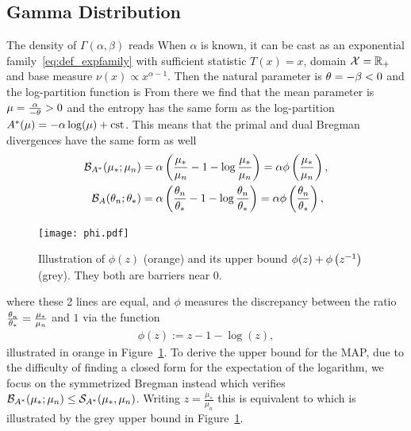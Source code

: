 \subsection{Gamma Distribution}
\label{app:gamma}
The density of $\Gamma(\alpha,\beta)$ reads
When $\alpha$ is known, it can be cast as an exponential family~\eqref{eq:def_expfamily} with sufficient statistic $T(x)=x$, domain ${\mathcal X} = \mathbb{R}_+$ and base measure $\nu(x)\propto x^{\alpha-1}$. Then the natural parameter is $\theta = -\beta < 0$ and the log-partition function is
From there we find that the mean parameter is $\mu = \frac{\alpha}{-\theta} >0$ and the entropy has the same form as the log-partition ${A^*}(\mu) = - \alpha \log(\mu) + \operatorname{cst}$.
This means that the primal and dual Bregman divergences have the same form as well
\begin{align}
	{\mathcal B}_{A^*}(\mu_*; \mu_n) 
	&= \alpha \left ( \frac{\mu_*}{ \mu_n} - 1 - \log  \frac{\mu_*}{ \mu_n} \right) 
	= \alpha \phi\left(\frac{\mu_*}{ \mu_n}\right),
	\\
	{\mathcal B}_A( \theta_n; \theta_* ) 
	&=  \alpha \left ( \frac{ \theta_n}{\theta_*} - 1 - \log  \frac{ \theta_n}{\theta_*} \right)
	= \alpha \phi\left(\frac{ \theta_n}{\theta_*}\right),
\end{align}
\begin{figure}
	\centering
	\texttt{[image: phi.pdf]}
	\caption{%
	Illustration of $\phi(z)$ (orange) and its upper bound $\phi(z) + \phi\left(z^{-1}\right)$ (grey).
	They both are barriers near $0$.
	}
	\label{fig:phi}
\end{figure}
where these 2 lines are equal, and $\phi$ measures the discrepancy between the ratio $\frac{ \theta_n}{\theta_*} =  \frac{\mu_*}{ \mu_n}  $ and $1$ via the function
\begin{align}
	\phi(z) := z - 1 - \log(z),
\end{align}
illustrated in orange in Figure~\ref{fig:phi}.
To derive the upper bound for the MAP, due to the difficulty of finding a closed form for the expectation of the logarithm, we focus on the symmetrized Bregman instead
which verifies ${\mathcal B}_{A^*}( \mu_*; \mu_n) \leq {\mathcal S}_{{A^*}} (\mu_*, \mu_n )$.
Writing $z=\frac{\mu_*}{\mu_n}$ this is equivalent to
which is illustrated by the grey upper bound in Figure~\ref{fig:phi}.



